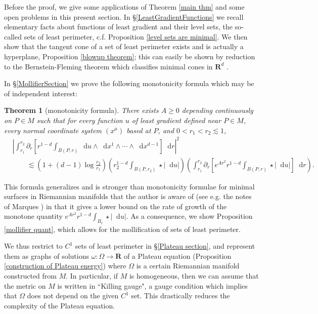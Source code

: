 \documentclass[reqno,12pt,letterpaper]{amsart}
\newcommand{\RR}{\mathbf{R}}
\newcommand*\dif{\mathop{}\!\mathrm{d}}
\newtheorem{theorem}{Theorem}[section]
\theoremstyle{definition}
\numberwithin{equation}{section}
\begin{document}
Before the proof, we give some applications of Theorem \ref{main thm} and some open problems in this present section.
In \S\ref{LeastGradientFunctions} we recall elementary facts about functions of least gradient and their level sets, the so-called sets of least perimeter, c.f. Proposition \ref{level sets are minimal}.
We then show that the tangent cone of a set of least perimeter exists and is actually a hyperplane, Proposition \ref{blowup theorem}; this can easily be shown by reduction to the Bernstein-Fleming theorem which classifies minimal cones in $\RR^d$ \cite[Theorem 17.3]{Giusti77}.

In \S\ref{MollifierSection} we prove the following monotonicity formula which may be of independent interest:

\begin{theorem}[monotonicity formula]\label{monotonicity prestate}
There exists $A \geq 0$ depending continuously on $P \in M$ such that for every function $u$ of least gradient defined near $P \in M$, every normal coordinate system $(x^\mu)$ based at $P$, and $0 < r_1 < r_2 \lesssim 1$,
\begin{align*}
&\left|\int_{r_1}^{r_2} \partial_r \left[r^{1 - d} \int_{B(P, r)} \dif u \wedge \dif x^1 \wedge \cdots \wedge \dif x^{d - 1}\right] \dif r\right|^2 \\
&\qquad \lesssim \left(1 + (d - 1) \log \frac{r_2}{r_1}\right) \left(r_2^{1 - d}\int_{B(P, r_2)} \star |\dif u| \right)\left(\int_{r_1}^{r_2} \partial_r \left[e^{Ar^2} r^{1 - d} \int_{B(P, r)} \star |\dif u|\right] \dif r\right).
\end{align*}
\end{theorem}

This formula generalizes \cite[Theorem 2.8]{Miranda66} and is stronger than monotonicity formulae for minimal surfaces in Riemannian manifolds that the author is aware of (see e.g. the notes of Marques \cite[\S7]{MarquesXX}) in that it gives a lower bound on the rate of growth of the monotone quantity $e^{Ar^2} r^{1 - d} \int_{B_r} \star |\dif u|$.
As a consequence, we show Proposition \ref{mollifier quant}, which allows for the mollification of sets of least perimeter.

We thus restrict to $C^1$ sets of least perimeter in \S\ref{Plateau section}, and represent them as graphs of solutions $\omega: \Omega \to \RR$ of a Plateau equation (Proposition \ref{construction of Plateau energy}) where $\Omega$ is a certain Riemannian manifold constructed from $M$.
In particular, if $M$ is homogeneous, then we can assume that the metric on $M$ is written in ``Killing gauge", a gauge condition which implies that $\Omega$ does not depend on the given $C^1$ set.
This drastically reduces the complexity of the Plateau equation.
\end{document}
